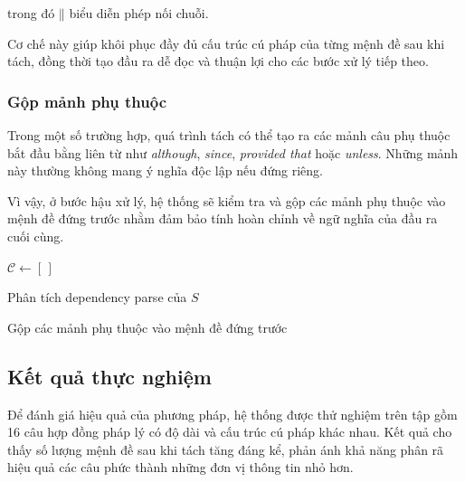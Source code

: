 trong đó $\mathbin{\|}$ biểu diễn phép nối chuỗi.

Cơ chế này giúp khôi phục đầy đủ cấu trúc cú pháp của từng mệnh đề sau
khi tách, đồng thời tạo đầu ra dễ đọc và thuận lợi cho các bước xử lý tiếp
theo.

\subsubsection{Gộp mảnh phụ thuộc}

Trong một số trường hợp, quá trình tách có thể tạo ra các mảnh câu phụ
thuộc bắt đầu bằng liên từ như \textit{although}, \textit{since},
\textit{provided that} hoặc \textit{unless}. Những mảnh này thường không
mang ý nghĩa độc lập nếu đứng riêng.

Vì vậy, ở bước hậu xử lý, hệ thống sẽ kiểm tra và gộp các mảnh phụ thuộc
vào mệnh đề đứng trước nhằm đảm bảo tính hoàn chỉnh về ngữ nghĩa của đầu
ra cuối cùng.

\begin{algorithm}[H]
    \DontPrintSemicolon
    \SetAlgoLined

    $\mathcal{C} \leftarrow [\,]$\;

    Phân tích dependency parse của $S$\;



    Gộp các mảnh phụ thuộc vào mệnh đề đứng trước\;


    \caption{Thuật toán tách mệnh đề}
    \label{alg:clause-split}
\end{algorithm}

\subsection{Kết quả thực nghiệm}

Để đánh giá hiệu quả của phương pháp, hệ thống được thử nghiệm trên tập
gồm 16 câu hợp đồng pháp lý có độ dài và cấu trúc cú pháp khác nhau.
Kết quả cho thấy số lượng mệnh đề sau khi tách tăng đáng kể, phản ánh khả
năng phân rã hiệu quả các câu phức thành những đơn vị thông tin nhỏ hơn.

